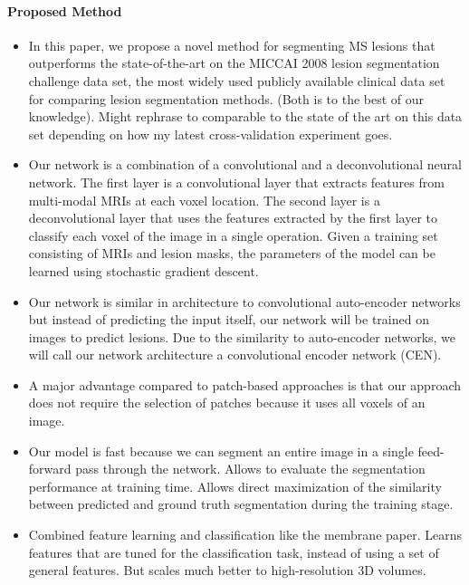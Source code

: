 \paragraph{Proposed Method}

\begin{itemize}

\item In this paper, we propose a novel method for segmenting MS lesions that
outperforms the state-of-the-art on the MICCAI 2008 lesion segmentation
challenge data set, the most widely used publicly available clinical data set
for comparing lesion segmentation methods. (Both is to the best of our
knowledge). Might rephrase to comparable to the state of the art on this data
set depending on how my latest cross-validation experiment goes.

\item Our network is a combination of a convolutional and a deconvolutional
neural network. The first layer is a convolutional layer \cite{LeCun1998} that
extracts features from multi-modal MRIs at each voxel location. The second layer
is a deconvolutional layer \cite{zeiler2011} that uses the features extracted by
the first layer to classify each voxel of the image in a single operation. Given
a training set consisting of MRIs and lesion masks, the parameters of the model
can be learned using stochastic gradient descent.

\item Our network is similar in architecture to convolutional auto-encoder
networks but instead of predicting the input itself, our network will be trained
on images to predict lesions. Due to the similarity to auto-encoder networks, we
will call our network architecture a convolutional encoder network (CEN).

\item A major advantage compared to patch-based approaches is that our approach
does not require the selection of patches because it uses all voxels of an
image.

\item Our model is fast because we can segment an entire image in a single
feed-forward pass through the network. Allows to evaluate the segmentation
performance at training time. Allows direct maximization of the similarity
between predicted and ground truth segmentation during the training stage.

\item Combined feature learning and classification like the membrane paper.
Learns features that are tuned for the classification task, instead of using a
set of general features. But scales much better to high-resolution 3D volumes.


\end{itemize}

